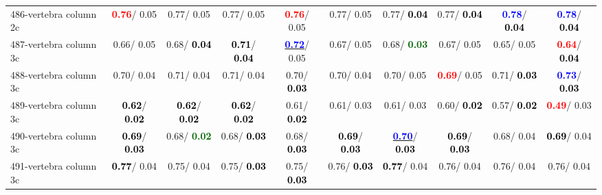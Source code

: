 \begin{table}[h]
\begin{center}
{\begin{tabular}{lc|c|c|c|c|c|c|c|c}
486-vertebra column 2c & \textcolor{red}{\textbf{  0.76}}/  0.05 &   0.77/  0.05 &   0.77/  0.05 & \textcolor{red}{\textbf{  0.76}}/  0.05 &   0.77/  0.05 &   0.77/\textcolor{black}{\textbf{  0.04}} &   0.77/\textcolor{black}{\textbf{  0.04}} & \textcolor{blue}{\textbf{  0.78}}/\textcolor{black}{\textbf{  0.04}} & \textcolor{blue}{\textbf{  0.78}}/\textcolor{black}{\textbf{  0.04}} \\
487-vertebra column 3c &   0.66/  0.05 &   0.68/\textcolor{black}{\textbf{  0.04}} & \textcolor{black}{\textbf{  0.71}}/\textcolor{black}{\textbf{  0.04}} & \underline{\textcolor{blue}{\textbf{  0.72}}}/  0.05 &   0.67/  0.05 &   0.68/\textcolor{darkgreen}{\textbf{  0.03}} &   0.67/  0.05 &   0.65/  0.05 & \textcolor{red}{\textbf{  0.64}}/\textcolor{black}{\textbf{  0.04}} \\ \hline
488-vertebra column 3c &   0.70/  0.04 &   0.71/  0.04 &   0.71/  0.04 &   0.70/\textcolor{black}{\textbf{  0.03}} &   0.70/  0.04 &   0.70/  0.05 & \textcolor{red}{\textbf{  0.69}}/  0.05 &   0.71/\textcolor{black}{\textbf{  0.03}} & \textcolor{blue}{\textbf{  0.73}}/\textcolor{black}{\textbf{  0.03}} \\
489-vertebra column 3c & \textcolor{black}{\textbf{  0.62}}/\textcolor{black}{\textbf{  0.02}} & \textcolor{black}{\textbf{  0.62}}/\textcolor{black}{\textbf{  0.02}} & \textcolor{black}{\textbf{  0.62}}/\textcolor{black}{\textbf{  0.02}} &   0.61/\textcolor{black}{\textbf{  0.02}} &   0.61/  0.03 &   0.61/  0.03 &   0.60/\textcolor{black}{\textbf{  0.02}} &   0.57/\textcolor{black}{\textbf{  0.02}} & \textcolor{red}{\textbf{  0.49}}/  0.03 \\
490-vertebra column 3c & \textcolor{black}{\textbf{  0.69}}/\textcolor{black}{\textbf{  0.03}} &   0.68/\textcolor{darkgreen}{\textbf{  0.02}} &   0.68/\textcolor{black}{\textbf{  0.03}} &   0.68/\textcolor{black}{\textbf{  0.03}} & \textcolor{black}{\textbf{  0.69}}/\textcolor{black}{\textbf{  0.03}} & \underline{\textcolor{blue}{\textbf{  0.70}}}/\textcolor{black}{\textbf{  0.03}} & \textcolor{black}{\textbf{  0.69}}/\textcolor{black}{\textbf{  0.03}} &   0.68/  0.04 & \textcolor{black}{\textbf{  0.69}}/  0.04 \\
491-vertebra column 3c & \textcolor{black}{\textbf{  0.77}}/  0.04 &   0.75/  0.04 &   0.75/\textcolor{black}{\textbf{  0.03}} &   0.75/\textcolor{black}{\textbf{  0.03}} &   0.76/\textcolor{black}{\textbf{  0.03}} & \textcolor{black}{\textbf{  0.77}}/  0.04 &   0.76/  0.04 &   0.76/  0.04 &   0.76/  0.04 \\

\end{tabular}}
\end{center}
\end{table}

